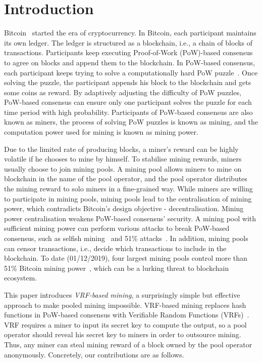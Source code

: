 \section{Introduction}
\label{sec:intro}

Bitcoin~\cite{nakamoto2008bitcoin} started the era of cryptocurrency.
In Bitcoin, each participant maintains its own ledger.
The ledger is structured as a blockchain, i.e., a chain of blocks of transactions.
Participants keep executing Proof-of-Work (PoW)-based consensus to agree on blocks and append them to the blockchain.
In PoW-based consensus, each participant keeps trying to solve a computationally hard PoW puzzle~\cite{dwork1992pricing}.
Once solving the puzzle, the participant appends his block to the blockchain and gets some coins as reward.
By adaptively adjusting the difficulty of PoW puzzles, PoW-based consensus can ensure only one participant solves the puzzle for each time period with high probability.
Participants of PoW-based consensus are also known as miners, the process of solving PoW puzzles is known as mining, and the computation power used for mining is known as mining power.

Due to the limited rate of producing blocks, a miner's reward can be highly volatile if he chooses to mine by himself.
To stabilise mining rewards, miners usually choose to join mining pools.
A mining pool allows miners to mine on blockchain in the name of the pool operator, and the pool operator distributes the mining reward to solo miners in a fine-grained way.
While miners are willing to participate in mining pools, mining pools lead to the centralisation of mining power, which contradicts Bitcoin's design objective - decentralisation.
Mining power centralisation weakens PoW-based consensus' security.
A mining pool with sufficient mining power can perform various attacks to break PoW-based consensus, such as selfish mining~\cite{eyal2018majority} and 51\% attacks~\cite{nakamoto2008bitcoin}.
In addition, mining pools can censor transactions, i.e., decide which transactions to include in the blockchain.
To date (01/12/2019), four largest mining pools control more than 51\% Bitcoin mining power~\cite{btc-com}, which can be a lurking threat to blockchain ecosystem.

This paper introduces \textit{VRF-based mining}, a surprisingly simple but effective approach to make pooled mining impossible.
VRF-based mining replaces hash functions in PoW-based consensus with Verifiable Random Functions (VRFs)~\cite{micali1999verifiable}.
VRF requires a miner to input its secret key to compute the output, so a pool operator should reveal his secret key to miners in order to outsource mining.
Thus, any miner can steal mining reward of a block owned by the pool operator anonymously.
Concretely, our contributions are as follows.


